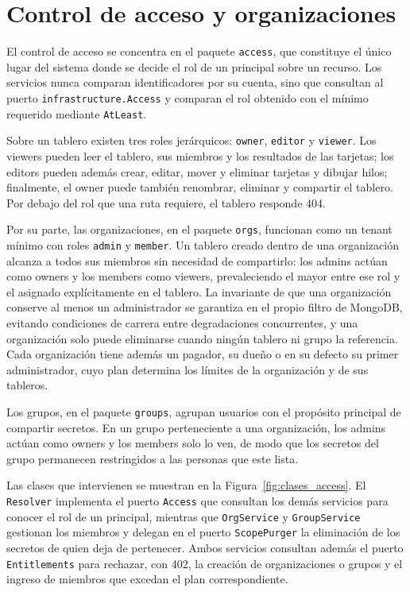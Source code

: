 \section{Control de acceso y organizaciones}
El control de acceso se concentra en el paquete \texttt{access}, que constituye el único lugar del sistema donde se decide el rol de un principal sobre un recurso. Los servicios nunca comparan identificadores por su cuenta, sino que consultan al puerto \texttt{infrastructure.Access} y comparan el rol obtenido con el mínimo requerido mediante \texttt{AtLeast}.

Sobre un tablero existen tres roles jerárquicos: \texttt{owner}, \texttt{editor} y \texttt{viewer}. Los viewers pueden leer el tablero, sus miembros y los resultados de las tarjetas; los editors pueden además crear, editar, mover y eliminar tarjetas y dibujar hilos; finalmente, el owner puede también renombrar, eliminar y compartir el tablero. Por debajo del rol que una ruta requiere, el tablero responde 404.

Por su parte, las organizaciones, en el paquete \texttt{orgs}, funcionan como un tenant mínimo con roles \texttt{admin} y \texttt{member}. Un tablero creado dentro de una organización alcanza a todos sus miembros sin necesidad de compartirlo: los admins actúan como owners y los members como viewers, prevaleciendo el mayor entre ese rol y el asignado explícitamente en el tablero. La invariante de que una organización conserve al menos un administrador se garantiza en el propio filtro de MongoDB, evitando condiciones de carrera entre degradaciones concurrentes, y una organización solo puede eliminarse cuando ningún tablero ni grupo la referencia. Cada organización tiene además un pagador, su dueño o en su defecto su primer administrador, cuyo plan determina los límites de la organización y de sus tableros.

Los grupos, en el paquete \texttt{groups}, agrupan usuarios con el propósito principal de compartir secretos. En un grupo perteneciente a una organización, los admins actúan como owners y los members solo lo ven, de modo que los secretos del grupo permanecen restringidos a las personas que este lista.

Las clases que intervienen se muestran en la Figura~\ref{fig:clases_access}. El \texttt{Resolver} implementa el puerto \texttt{Access} que consultan los demás servicios para conocer el rol de un principal, mientras que \texttt{OrgService} y \texttt{GroupService} gestionan los miembros y delegan en el puerto \texttt{ScopePurger} la eliminación de los secretos de quien deja de pertenecer. Ambos servicios consultan además el puerto \texttt{Entitlements} para rechazar, con 402, la creación de organizaciones o grupos y el ingreso de miembros que excedan el plan correspondiente.

